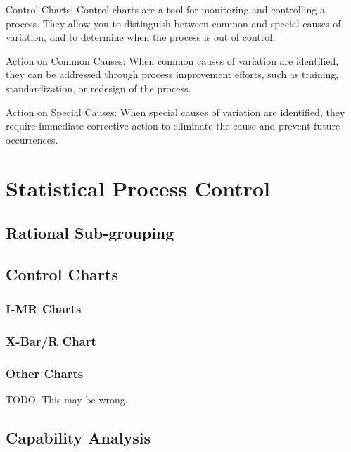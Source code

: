 \documentclass[11pt]{article}
\begin{document}
Control Charts: Control charts are a tool for monitoring and controlling
a process. They allow you to distinguish between common and special
causes of variation, and to determine when the process is out of
control.

Action on Common Causes: When common causes of variation are identified,
they can be addressed through process improvement efforts, such as
training, standardization, or redesign of the process.

Action on Special Causes: When special causes of variation are
identified, they require immediate corrective action to eliminate the
cause and prevent future occurrences.

    \hypertarget{statistical-process-control}{%
\section{Statistical Process
Control}\label{statistical-process-control}}

    \hypertarget{rational-sub-grouping}{%
\subsection{Rational Sub-grouping}\label{rational-sub-grouping}}

\hypertarget{control-charts}{%
\subsection{Control Charts}\label{control-charts}}

\hypertarget{i-mr-charts}{%
\subsubsection{I-MR Charts}\label{i-mr-charts}}

\hypertarget{x-barr-chart}{%
\subsubsection{X-Bar/R Chart}\label{x-barr-chart}}

\hypertarget{other-charts}{%
\subsubsection{Other Charts}\label{other-charts}}

TODO. This may be wrong. 
\hypertarget{capability-analysis}{%
\subsection{Capability Analysis}\label{capability-analysis}}
\end{document}
